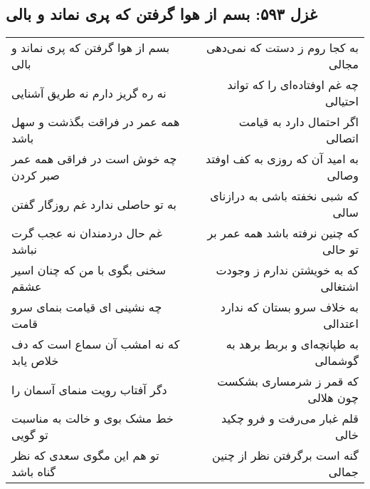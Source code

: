 \begin{center}
\section*{غزل ۵۹۳: بسم از هوا گرفتن که پری نماند و بالی}
\label{sec:593}
\begin{longtable}{l p{0.5cm} r}
بسم از هوا گرفتن که پری نماند و بالی
&&
به کجا روم ز دستت که نمی‌دهی مجالی
\\
نه ره گریز دارم نه طریق آشنایی
&&
چه غم اوفتاده‌ای را که تواند احتیالی
\\
همه عمر در فراقت بگذشت و سهل باشد
&&
اگر احتمال دارد به قیامت اتصالی
\\
چه خوش است در فراقی همه عمر صبر کردن
&&
به امید آن که روزی به کف اوفتد وصالی
\\
به تو حاصلی ندارد غم روزگار گفتن
&&
که شبی نخفته باشی به درازنای سالی
\\
غم حال دردمندان نه عجب گرت نباشد
&&
که چنین نرفته باشد همه عمر بر تو حالی
\\
سخنی بگوی با من که چنان اسیر عشقم
&&
که به خویشتن ندارم ز وجودت اشتغالی
\\
چه نشینی ای قیامت بنمای سرو قامت
&&
به خلاف سرو بستان که ندارد اعتدالی
\\
که نه امشب آن سماع است که دف خلاص یابد
&&
به طپانچه‌ای و بربط برهد به گوشمالی
\\
دگر آفتاب رویت منمای آسمان را
&&
که قمر ز شرمساری بشکست چون هلالی
\\
خط مشک بوی و خالت به مناسبت تو گویی
&&
قلم غبار می‌رفت و فرو چکید خالی
\\
تو هم این مگوی سعدی که نظر گناه باشد
&&
گنه است برگرفتن نظر از چنین جمالی
\\
\end{longtable}
\end{center}
